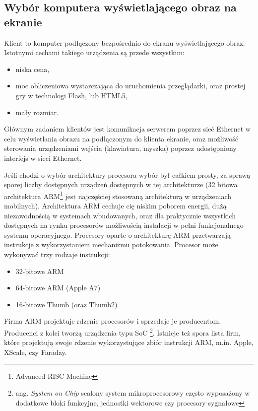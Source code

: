 \subsection{Wybór komputera wyświetlającego obraz na ekranie}
\label{sec:Komputer wyświetlający obraz na ekranie}

Klient to komputer podłączony bezpośrednio do ekranu wyświetlającego obraz. Istotnymi cechami takiego urządzenia są przede wszystkim:
\begin{itemize}
	\item niska cena,
	\item moc obliczeniowa wystarczająca do uruchomienia przeglądarki, oraz prostej gry w technologi Flash, lub HTML5,
	\item mały rozmiar.
\end{itemize}

Głównym zadaniem klientów jest komunikacja serwerem poprzez sieć Ethernet w celu wyświetlania obrazu na podłączonym do klienta ekranie, oraz możliwość sterowania urządzeniami wejścia (klawiatura, myszka) poprzez udostępniony interfejs w sieci Ethernet.

Jeśli chodzi o wybór architektury procesora wybór był całkiem prosty, za sprawą sporej liczby dostępnych urządzeń dostępnych w tej architekturze (32 bitowa architektura ARM\footnote{Advanced RISC Machine} jest najczęściej stosowaną architekturą w urządzeniach mobilnych\cite{acm}). Architektura ARM cechuje cię niskim poborem energii, dużą niezawodnością w systemach wbudowanych, oraz dla praktycznie wszystkich dostępnych na rynku procesorów możliwością instalacji w pełni funkcjonalnego systemu operacyjnego.
Procesory oparte o architekturę ARM przetwarzają instrukcje z wykorzystaniem mechanizmu potokowania. Procesor może wykonywać trzy rodzaje instrukcji:
\begin{itemize}
	\item 32-bitowe ARM
	\item 64-bitowe ARM (Apple A7)
	\item 16-bitowe Thumb (oraz Thumb2)
\end{itemize}

\par
Firma ARM projektuje rdzenie procesorów i sprzedaje je producentom. Producenci z kolei tworzą urządzenia typu SoC \footnote{ang. \emph{System on Chip} scalony system mikroprocesorowy często wyposażony w dodatkowe bloki funkcyjne, jednostki wektorowe czy procesory sygnałowe}. Istnieje też spora lista firm, które projektują swoje rdzenie wykorzystujące zbiór instrukcji ARM, m.in. Apple, XScale, czy Faraday.

